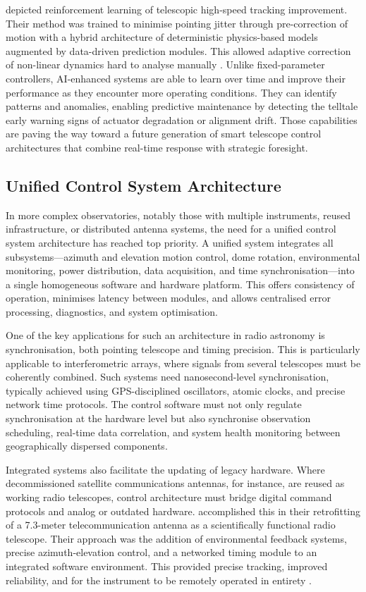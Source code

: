     \cite{Waltenberger2024} depicted reinforcement learning of telescopic high-speed tracking improvement. Their method was trained to minimise pointing jitter through pre-correction of motion with a hybrid architecture of deterministic physics-based models augmented by data-driven prediction modules. This allowed adaptive correction of non-linear dynamics hard to analyse manually \cite{Waltenberger2024}. Unlike fixed-parameter controllers, AI-enhanced systems are able to learn over time and improve their performance as they encounter more operating conditions. They can identify patterns and anomalies, enabling predictive maintenance by detecting the telltale early warning signs of actuator degradation or alignment drift. Those capabilities are paving the way toward a future generation of smart telescope control architectures that combine real-time response with strategic foresight.

    \subsection{Unified Control System Architecture}
    In more complex observatories, notably those with multiple instruments, reused infrastructure, or distributed antenna systems, the need for a unified control system architecture has reached top priority. A unified system integrates all subsystems—azimuth and elevation motion control, dome rotation, environmental monitoring, power distribution, data acquisition, and time synchronisation—into a single homogeneous software and hardware platform. This offers consistency of operation, minimises latency between modules, and allows centralised error processing, diagnostics, and system optimisation.

    One of the key applications for such an architecture in radio astronomy is synchronisation, both pointing telescope and timing precision. This is particularly applicable to interferometric arrays, where signals from several telescopes must be coherently combined. Such systems need nanosecond-level synchronisation, typically achieved using GPS-disciplined oscillators, atomic clocks, and precise network time protocols. The control software must not only regulate synchronisation at the hardware level but also synchronise observation scheduling, real-time data correlation, and system health monitoring between geographically dispersed components.

    Integrated systems also facilitate the updating of legacy hardware. Where decommissioned satellite communications antennas, for instance, are reused as working radio telescopes, control architecture must bridge digital command protocols and analog or outdated hardware. \cite{Ramadhani2022} accomplished this in their retrofitting of a 7.3-meter telecommunication antenna as a scientifically functional radio telescope. Their approach was the addition of environmental feedback systems, precise azimuth-elevation control, and a networked timing module to an integrated software environment. This provided precise tracking, improved reliability, and for the instrument to be remotely operated in entirety \cite{Ramadhani2022}.

